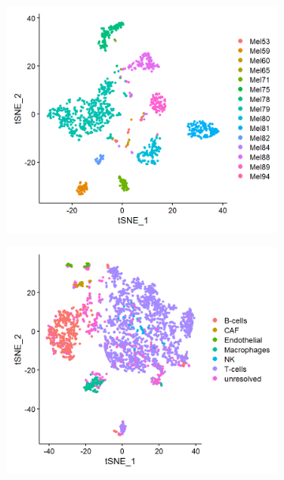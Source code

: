 \documentclass[11pt]{article}
\begin{document}
\begin{figure}
    \begin{subfigure}{.5\textwidth}
      \centering
      \includegraphics[width=.9\linewidth]{plots/plot_m-tsne-novf-tumor.png}
      \caption{}
      \label{fig:m-tsne-novf}
    \end{subfigure}
    \begin{subfigure}{.5\textwidth}
      \centering
      \includegraphics[width=.9\linewidth]{plots/plot_nm-tsne-novf-cell.png}
      \caption{}
      \label{fig:nm-tsne-novf}
    \end{subfigure}
    \begin{subfigure}{.5\textwidth}
      \centering

\end{subfigure}
\end{figure}
\end{document}
